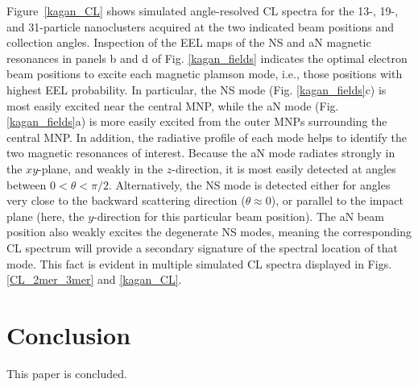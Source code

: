 \documentclass[journal=apchd5,manuscript=article]{achemso}
\begin{document}
Figure~\ref{kagan_CL} shows simulated angle-resolved CL spectra for the 13-, 19-, and 31-particle nanoclusters acquired at the two indicated beam positions and collection angles. Inspection of the EEL maps of the NS and aN magnetic resonances in panels b and d of Fig. \ref{kagan_fields} indicates the optimal electron beam positions to excite each magnetic plamson mode, i.e., those positions with highest EEL probability. In particular, the NS mode (Fig. \ref{kagan_fields}c) is most easily excited near the central MNP, while the aN mode (Fig. \ref{kagan_fields}a) is more easily excited from the outer MNPs surrounding the central MNP. In addition, the radiative profile of each mode helps to identify the two magnetic resonances of interest. Because the aN mode radiates strongly in the $xy$-plane, and weakly in the $z$-direction, it is most easily detected at angles between $0 < \theta < \pi/2$. Alternatively, the NS mode is detected either for angles very close to the backward scattering direction ($\theta \approx 0$), or parallel to the impact plane (here, the $y$-direction for this particular beam position). The aN beam position also weakly excites the degenerate NS modes, meaning the corresponding CL spectrum will provide a secondary signature of the spectral location of that mode. This fact is evident in multiple simulated CL spectra displayed in Figs. \ref{CL_2mer_3mer} and \ref{kagan_CL}.




\section{Conclusion}
This paper is concluded.
\end{document}
